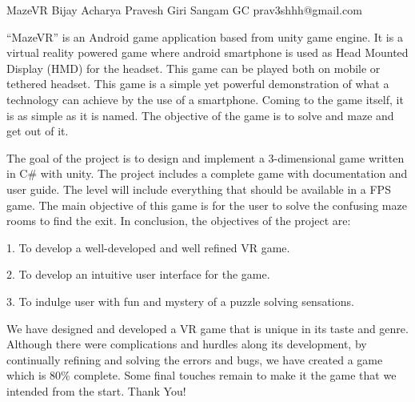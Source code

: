  \begin{conf-abstract}[]
 {MazeVR }
 {Bijay Acharya Pravesh Giri Sangam GC
 }
{prav3shhh@gmail.com}

“MazeVR” is an Android game application based from unity game engine. It is a virtual reality powered game where android smartphone is used as Head Mounted Display (HMD) for the headset. This game can be played both on mobile or tethered headset. This game is a simple yet powerful demonstration of what a technology can achieve by the use of a smartphone. Coming to the game itself, it is as simple as it is named. The objective of the game is to solve and maze and get out of it.

The goal of the project is to design and implement a 3-dimensional game written in C\# with unity. The project includes a complete game with documentation and user guide. The level will include everything that should be available in a FPS game. The main objective of this game is for the user to solve the confusing maze rooms to find the exit. 
In conclusion, the objectives of the project are:

1.	To develop a well-developed and well refined VR game.

2.	To develop an intuitive user interface for the game.

3.	To indulge user with fun and mystery of a puzzle solving sensations.

We have designed and developed a VR game that is unique in its taste and genre. Although there were complications and hurdles along its development, by continually refining and solving the errors and bugs, we have created a game which is 80\% complete. Some final touches remain to make it the game that we intended from the start. Thank You!
 \end{conf-abstract}